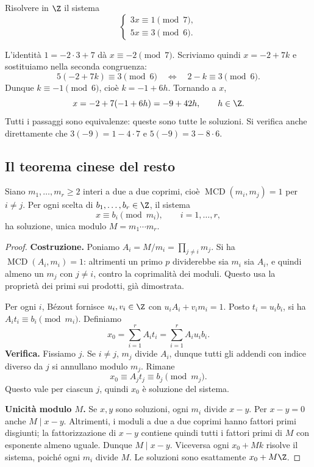 \begin{esercizio}
Risolvere in $\Z$ il sistema
\[
\begin{cases}
3x\equiv1\pmod7,\\
5x\equiv3\pmod6.
\end{cases}
\]
\end{esercizio}
\begin{svolgimento}
L'identità $1=-2\cdot3+7$ dà $x\equiv-2\pmod7$. Scriviamo quindi $x=-2+7k$ e sostituiamo nella seconda congruenza:
\[
5(-2+7k)\equiv3\pmod6
\quad\Longleftrightarrow\quad 2-k\equiv3\pmod6.
\]
Dunque $k\equiv-1\pmod6$, cioè $k=-1+6h$. Tornando a $x$,
\[
x=-2+7(-1+6h)=-9+42h,\qquad h\in\Z.
\]
Tutti i passaggi sono equivalenze: queste sono tutte le soluzioni. Si verifica anche direttamente che $3(-9)=1-4\cdot7$ e $5(-9)=3-8\cdot6$.
\end{svolgimento}

\subsection{Il teorema cinese del resto}
\begin{teorema}\label{teo:cinese}
Siano $m_1,\ldots,m_r\ge2$ interi a due a due coprimi, cioè $\operatorname{MCD}(m_i,m_j)=1$ per $i\ne j$. Per ogni scelta di $b_1,\ldots,b_r\in\Z$, il sistema
\[
x\equiv b_i\pmod{m_i},\qquad i=1,\ldots,r,
\]
ha soluzione, unica modulo $M=m_1\cdots m_r$.
\end{teorema}
\begin{proof}
\textbf{Costruzione.} Poniamo $A_i=M/m_i=\prod_{j\ne i}m_j$. Si ha $\operatorname{MCD}(A_i,m_i)=1$: altrimenti un primo $p$ dividerebbe sia $m_i$ sia $A_i$, e quindi almeno un $m_j$ con $j\ne i$, contro la coprimalità dei moduli. Questo usa la proprietà dei primi sui prodotti, già dimostrata.

Per ogni $i$, Bézout fornisce $u_i,v_i\in\Z$ con $u_iA_i+v_im_i=1$. Posto $t_i=u_ib_i$, si ha $A_it_i\equiv b_i\pmod{m_i}$. Definiamo
\[
x_0=\sum_{i=1}^r A_it_i=\sum_{i=1}^r A_iu_ib_i.
\]
\textbf{Verifica.} Fissiamo $j$. Se $i\ne j$, $m_j$ divide $A_i$, dunque tutti gli addendi con indice diverso da $j$ si annullano modulo $m_j$. Rimane
\[
x_0\equiv A_jt_j\equiv b_j\pmod{m_j}.
\]
Questo vale per ciascun $j$, quindi $x_0$ è soluzione del sistema.

\textbf{Unicità modulo $M$.} Se $x,y$ sono soluzioni, ogni $m_i$ divide $x-y$. Per $x-y=0$ anche $M\mid x-y$. Altrimenti, i moduli a due a due coprimi hanno fattori primi disgiunti; la fattorizzazione di $x-y$ contiene quindi tutti i fattori primi di $M$ con esponente almeno uguale. Dunque $M\mid x-y$. Viceversa ogni $x_0+Mk$ risolve il sistema, poiché ogni $m_i$ divide $M$. Le soluzioni sono esattamente $x_0+M\Z$.
\end{proof}

